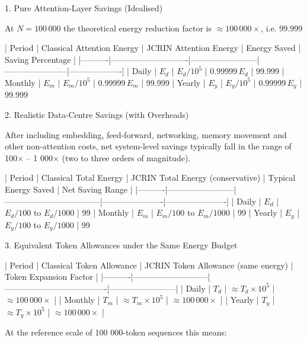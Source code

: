 1. Pure Attention-Layer Savings (Idealised)

At \(N = 100\,000\) the theoretical energy reduction factor is \(\approx 100\,000\times\), i.e. 99.999 %

| Period   | Classical Attention Energy | JCRIN Attention Energy | Energy Saved          | Saving Percentage |
|----------|----------------------------|------------------------|-----------------------|-------------------|
| Daily    | \(E_d\)                    | \(E_d / 10^5\)         | \(0.99999\,E_d\)      | 99.999 %
| Monthly  | \(E_m\)                    | \(E_m / 10^5\)         | \(0.99999\,E_m\)      | 99.999 %
| Yearly   | \(E_y\)                    | \(E_y / 10^5\)         | \(0.99999\,E_y\)      | 99.999 %

2. Realistic Data-Centre Savings (with Overheads)

After including embedding, feed-forward, networking, memory movement and other non-attention costs, net system-level savings typically fall in the range of 100× – 1 000× (two to three orders of magnitude).

| Period   | Classical Total Energy | JCRIN Total Energy (conservative) | Typical Energy Saved | Net Saving Range     |
|----------|------------------------|-----------------------------------|----------------------|----------------------|
| Daily    | \(E_d\)                | \(E_d / 100\) to \(E_d / 1000\)   | 99 %
| Monthly  | \(E_m\)                | \(E_m / 100\) to \(E_m / 1000\)   | 99 %
| Yearly   | \(E_y\)                | \(E_y / 100\) to \(E_y / 1000\)   | 99 %

3. Equivalent Token Allowances under the Same Energy Budget

| Period   | Classical Token Allowance | JCRIN Token Allowance (same energy) | Token Expansion Factor |
|----------|---------------------------|-------------------------------------|------------------------|
| Daily    | \(T_d\)                   | \(\approx T_d \times 10^5\)         | \(\approx 100\,000\times\) |
| Monthly  | \(T_m\)                   | \(\approx T_m \times 10^5\)         | \(\approx 100\,000\times\) |
| Yearly   | \(T_y\)                   | \(\approx T_y \times 10^5\)         | \(\approx 100\,000\times\) |

At the reference scale of 100 000-token sequences this means:

